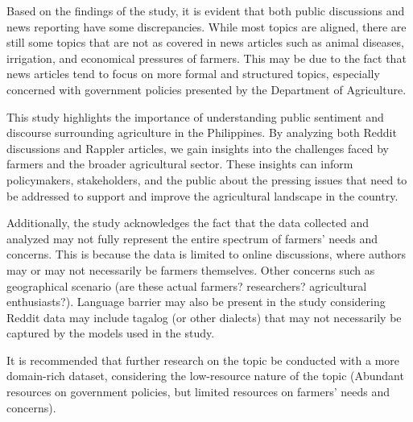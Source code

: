 \documentclass[conference]{IEEEtran}
\begin{document}
Based on the findings of the study, it is evident that both public discussions and news reporting have some discrepancies.
While most topics are aligned, there are still some topics that are not as covered in news articles such as animal diseases, irrigation, and economical pressures of farmers.
This may be due to the fact that news articles tend to focus on more formal and structured topics, especially concerned with government policies presented by the Department of Agriculture.

This study highlights the importance of understanding public sentiment and discourse surrounding agriculture in the Philippines.
By analyzing both Reddit discussions and Rappler articles, we gain insights into the challenges faced by farmers and the broader agricultural sector.
These insights can inform policymakers, stakeholders, and the public about the pressing issues that need to be addressed to support and improve the agricultural landscape in the country.

Additionally, the study acknowledges the fact that the data collected and analyzed may not fully represent the entire spectrum of farmers' needs and concerns. This is because
the data is limited to online discussions, where authors may or may not necessarily be farmers themselves. Other concerns such as geographical scenario (are these actual farmers? researchers? agricultural enthusiasts?).
Language barrier may also be present in the study considering Reddit data may include tagalog (or other dialects) that may not necessarily be captured by the models used in the study.

It is recommended that further research on the topic be conducted with a more domain-rich dataset, considering the low-resource nature of the topic 
(Abundant resources on government policies, but limited resources on farmers' needs and concerns).

\end{document}
